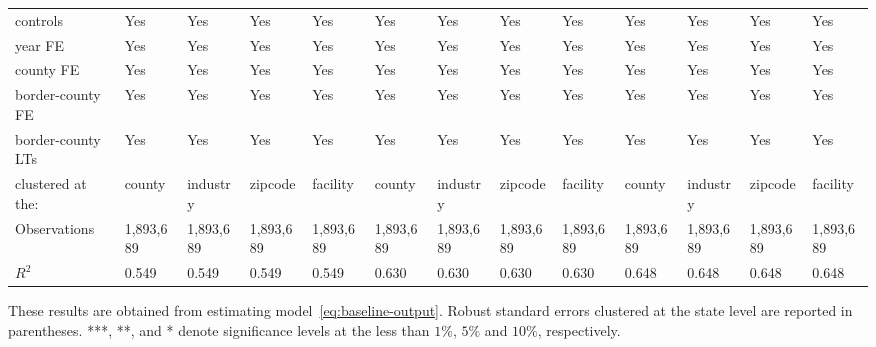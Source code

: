 \begin{table}[H]
{\begin{tabular}{@{}lllllllllllll@{}}
            controls                                                   & Yes       & Yes       & Yes       & Yes       & Yes       & Yes       & Yes       & Yes       & Yes       & Yes       & Yes       & Yes       \\
            year FE                                                    & Yes       & Yes       & Yes       & Yes       & Yes       & Yes       & Yes       & Yes       & Yes       & Yes       & Yes       & Yes       \\
            county FE                                                  & Yes       & Yes       & Yes       & Yes       & Yes       & Yes       & Yes       & Yes       & Yes       & Yes       & Yes       & Yes       \\
            border-county FE                                           & Yes       & Yes       & Yes       & Yes       & Yes       & Yes       & Yes       & Yes       & Yes       & Yes       & Yes       & Yes       \\
            border-county LTs                                          & Yes       & Yes       & Yes       & Yes       & Yes       & Yes       & Yes       & Yes       & Yes       & Yes       & Yes       & Yes       \\
            clustered at the:                                          & county    & industry  & zipcode   & facility  & county    & industry  & zipcode   & facility  & county    & industry  & zipcode   & facility  \\
            Observations                                               & 1,893,689 & 1,893,689 & 1,893,689 & 1,893,689 & 1,893,689 & 1,893,689 & 1,893,689 & 1,893,689 & 1,893,689 & 1,893,689 & 1,893,689 & 1,893,689 \\
            $R^2$                                                      & 0.549     & 0.549     & 0.549     & 0.549     & 0.630     & 0.630     & 0.630     & 0.630     & 0.648     & 0.648     & 0.648     & 0.648     \\ \bottomrule\bottomrule
        \end{tabular}%
    }
    \begin{minipage}{18cm}
        \vspace{0.05in}
        These results are obtained from estimating model~\ref{eq:baseline-output}. Robust standard errors clustered at the state level are reported in parentheses. ***, **, and * denote significance levels at the less than $1\%$, $5\%$ and $10\%$, respectively.
    \end{minipage}
\end{table}